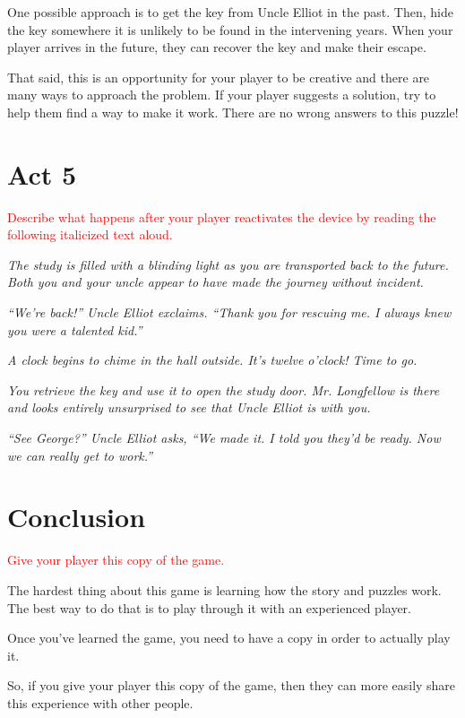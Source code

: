 \documentclass[a6paper, parskip=half, DIV=14, 12pt]{scrartcl}
\begin{document}
One possible approach is to get the key from Uncle Elliot in the past. Then, hide the key somewhere it is unlikely to be found in the intervening years. When your player arrives in the future, they can recover the key and make their escape.

That said, this is an opportunity for your player to be creative and there are many ways to approach the problem. If your player suggests a solution, try to help them find a way to make it work. There are no wrong answers to this puzzle!

\newpage

\section*{Act 5}
\textcolor{Red}{Describe what happens after your player reactivates the device by reading the following italicized text aloud.} 

\textit{The study is filled with a blinding light as you are transported back to the future. Both you and your uncle appear to have made the journey without incident.}


\textit{``We're back!'' Uncle Elliot exclaims. ``Thank you for rescuing me. I always knew you were a talented kid.''}

\textit{A clock begins to chime in the hall outside. It's twelve o'clock! Time to go.}

\textit{You retrieve the key and use it to open the study door. Mr. Longfellow is there and looks entirely unsurprised to see that Uncle Elliot is with you.}

\textit{``See George?'' Uncle Elliot asks, ``We made it. I told you they'd be ready. Now we can really get to work.''}

\newpage
\section*{Conclusion}
\textcolor{Red}{Give your player this copy of the game.}

The hardest thing about this game is learning how the story and puzzles work. The best way to do that is to play through it with an experienced player.

Once you've learned the game, you need to have a copy in order to actually play it.

So, if you give your player this copy of the game, then they can more easily share this experience with other people.
\end{document}
